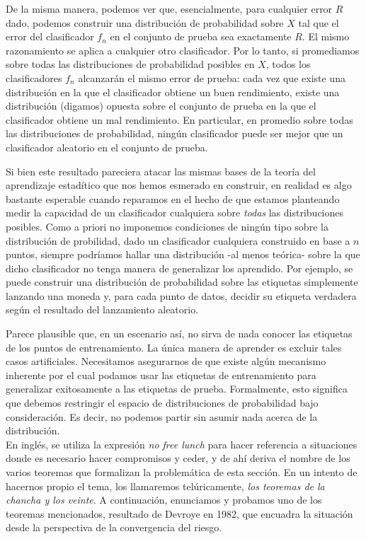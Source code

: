 \documentclass{article}
\begin{document}
De la misma manera, podemos ver que, esencialmente, para cualquier error \(R\) dado, podemos 
construir una distribución de probabilidad sobre \(X\) tal que el error del clasificador \(f_n\) en el 
conjunto de prueba sea exactamente \(R\). El mismo razonamiento se aplica a cualquier otro 
clasificador. Por lo tanto, si promediamos sobre todas las distribuciones de probabilidad posibles en \(X\), 
todos los clasificadores \(f_n\) alcanzarán el mismo error de prueba: cada vez que existe una 
distribución en la que el clasificador obtiene un buen rendimiento, existe una distribución 
(digamos) opuesta sobre el conjunto de prueba en la que el clasificador obtiene un mal rendimiento.
En particular, en promedio sobre todas las distribuciones de probabilidad, ningún 
clasificador puede ser mejor que un clasificador aleatorio en el conjunto de prueba.\newline

Si bien este resultado pareciera atacar las mismas bases de la teoría del aprendizaje estadítico que nos hemos esmerado en 
construir, en realidad es algo bastante esperable cuando reparamos en el hecho de que estamos planteando
medir la capacidad de un clasificador cualquiera sobre \textit{todas} las distribuciones posibles. Como a priori
no imponemos condiciones de ningún tipo sobre la distribución de probilidad, dado un clasificador cualquiera construido
en base a $n$ puntos, siempre podríamos hallar una distribución -al menos teórica- sobre la que dicho clasificador no tenga
manera de generalizar los aprendido. Por ejemplo, se puede construir una distribución de probabilidad sobre las etiquetas simplemente 
lanzando una moneda y, para cada punto de datos, decidir su etiqueta verdadera según el resultado del 
lanzamiento aleatorio. \newline

Parece plausible que, en un escenario así, no sirva de nada conocer las etiquetas de los puntos de 
entrenamiento. La única manera de aprender es excluir tales casos artificiales. Necesitamos asegurarnos 
de que existe algún mecanismo inherente por el cual podamos usar las etiquetas de entrenamiento para 
generalizar exitosamente a las etiquetas de prueba. Formalmente, esto significa que debemos restringir 
el espacio de distribuciones de probabilidad bajo consideración. Es decir, no podemos partir sin asumir
nada acerca de la distribución.\\

En inglés, se utiliza la expresión \textit{no free lunch} para hacer referencia
a situaciones donde es necesario hacer compromisos y ceder, y de ahí deriva el nombre de los varios teoremas
que formalizan la problemática de esta sección. En un intento de hacernos propio el tema, los llamaremos 
telúricamente, \textit{los teoremas de la chancha y los veinte}. 
A continuación, enunciamos y probamos uno de los teoremas mencionados, resultado de Devroye en 1982, que encuadra la
situación desde la perspectiva de la convergencia del riesgo.\newline
\end{document}
